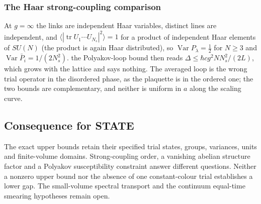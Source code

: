 \documentclass[11pt,a4paper]{article}
\begin{document}
\hypertarget{the-haar-strong-coupling-comparison}{%
\subsubsection{The Haar strong-coupling
comparison}\label{the-haar-strong-coupling-comparison}}

At \(g=\infty\) the links are independent Haar variables, distinct lines
are independent, and
\(\langle|\operatorname{tr}U_1\cdots U_{N_s}|^2\rangle=1\) for a product
of independent Haar elements of \(SU(N)\) (the product is again Haar
distributed), so \(\operatorname{Var}P_\lambda=\tfrac12\) for \(N\ge3\)
and \(\operatorname{Var}\bar P_i=1/(2N_s^2)\). the Polyakov-loop bound
then reads \(\Delta\le\hbar cg^2NN_s^2/(2L)\), which grows with the
lattice and says nothing. The averaged loop is the wrong trial operator
in the disordered phase, as the plaquette is in the ordered one; the two
bounds are complementary, and neither is uniform in \(a\) along the
scaling curve.

\hypertarget{consequence-for-state}{%
\subsection{Consequence for STATE}\label{consequence-for-state}}

The exact upper bounds retain their specified trial states, groups,
variances, units and finite-volume domains. Strong-coupling order, a
vanishing abelian structure factor and a Polyakov susceptibility
constraint answer different questions. Neither a nonzero upper bound nor
the absence of one constant-colour trial establishes a lower gap. The
small-volume spectral transport and the continuum equal-time smearing
hypotheses remain open.
\end{document}
